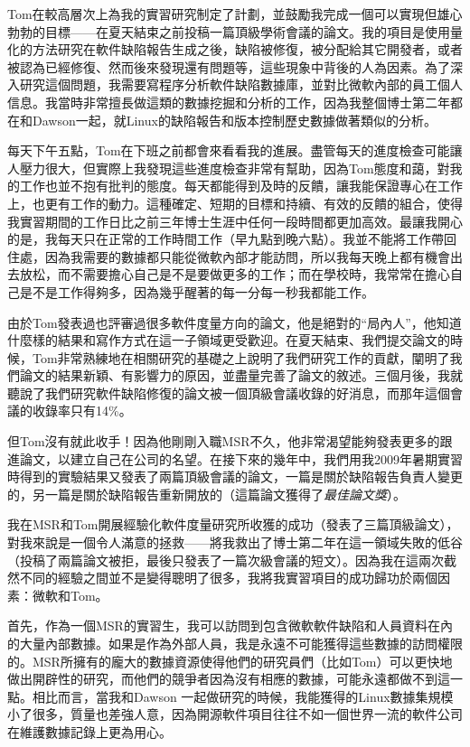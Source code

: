 \documentclass[12pt,UTF8,nofonts]{book}
\begin{document}
\breakline

Tom在較高層次上為我的實習研究制定了計劃，並鼓勵我完成一個可以實現但雄心勃勃的目標——在夏天結束之前投稿一篇頂級學術會議的論文。我的項目是使用量化的方法研究在軟件缺陷報告生成之後，缺陷被修復，被分配給其它開發者，或者被認為已經修復、然而後來發現還有問題等，這些現象中背後的人為因素。為了深入研究這個問題，我需要寫程序分析軟件缺陷數據庫，並對比微軟內部的員工個人信息。我當時非常擅長做這類的數據挖掘和分析的工作，因為我整個博士第二年都在和Dawson一起，就Linux的缺陷報告和版本控制歷史數據做著類似的分析。

每天下午五點，Tom在下班之前都會來看看我的進展。盡管每天的進度檢查可能讓人壓力很大，但實際上我發現這些進度檢查非常有幫助，因為Tom態度和藹，對我的工作也並不抱有批判的態度。每天都能得到及時的反饋，讓我能保證專心在工作上，也更有工作的動力。這種確定、短期的目標和持續、有效的反饋的組合，使得我實習期間的工作日比之前三年博士生涯中任何一段時間都更加高效。最讓我開心的是，我每天只在正常的工作時間工作（早九點到晚六點）。我並不能將工作帶回住處，因為我需要的數據都只能從微軟內部才能訪問，所以我每天晚上都有機會出去放松，而不需要擔心自己是不是要做更多的工作；而在學校時，我常常在擔心自己是不是工作得夠多，因為幾乎醒著的每一分每一秒我都能工作。

由於Tom發表過也評審過很多軟件度量方向的論文，他是絕對的“局內人”，他知道什麼樣的結果和寫作方式在這一子領域更受歡迎。在夏天結束、我們提交論文的時候，Tom非常熟練地在相關研究的基礎之上說明了我們研究工作的貢獻，闡明了我們論文的結果新穎、有影響力的原因，並盡量完善了論文的敘述。三個月後，我就聽說了我們研究軟件缺陷修復的論文被一個頂級會議收錄的好消息，而那年這個會議的收錄率只有14\%。

但Tom沒有就此收手！因為他剛剛入職MSR不久，他非常渴望能夠發表更多的跟進論文，以建立自己在公司的名望。在接下來的幾年中，我們用我2009年暑期實習時得到的實驗結果又發表了兩篇頂級會議的論文，一篇是關於缺陷報告負責人變更的，另一篇是關於缺陷報告重新開放的（這篇論文獲得了\emph{最佳論文獎}）。

\breakline

我在MSR和Tom開展經驗化軟件度量研究所收獲的成功（發表了三篇頂級論文），對我來說是一個令人滿意的拯救——將我救出了博士第二年在這一領域失敗的低谷（投稿了兩篇論文被拒，最後只發表了一篇次級會議的短文）。因為我在這兩次截然不同的經驗之間並不是變得聰明了很多，我將我實習項目的成功歸功於兩個因素：微軟和Tom。

首先，作為一個MSR的實習生，我可以訪問到包含微軟軟件缺陷和人員資料在內的大量內部數據。如果是作為外部人員，我是永遠不可能獲得這些數據的訪問權限的。MSR所擁有的龐大的數據資源使得他們的研究員們（比如Tom）可以更快地做出開辟性的研究，而他們的競爭者因為沒有相應的數據，可能永遠都做不到這一點。相比而言，當我和Dawson 一起做研究的時候，我能獲得的Linux數據集規模小了很多，質量也差強人意，因為開源軟件項目往往不如一個世界一流的軟件公司在維護數據記錄上更為用心。
\end{document}
